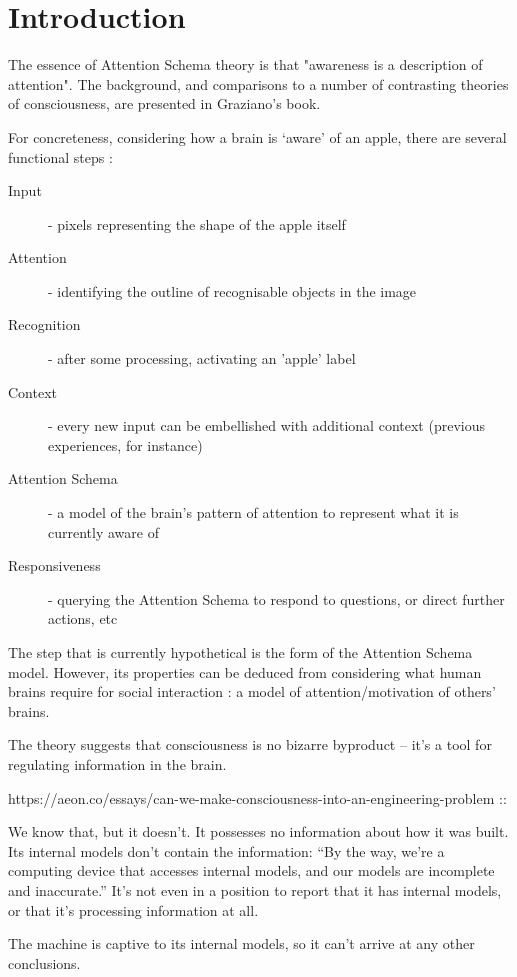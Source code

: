 \documentclass[citeauthoryear]{llncs}
\begin{document}
\section{Introduction}

The essence of Attention Schema theory is that "awareness is a description of attention".
The background, and comparisons to a number of contrasting theories of consciousness,
are presented in Graziano's \cite{graziano2013consciousness} book.  

For concreteness, considering how a brain is `aware' of an apple,
there are several functional steps :

\begin{description}
\item[Input] - pixels representing the shape of the apple itself
\item[Attention] - identifying the outline of recognisable objects in the image 
\item[Recognition] - after some processing, activating an 'apple' label
\item[Context] - every new input can be embellished with additional context (previous experiences, for instance)
\item[Attention Schema] - a model of the brain's pattern of attention to represent what it is currently aware of
\item[Responsiveness] - querying the Attention Schema to respond to questions, or direct further actions, etc
\end{description}

The step that is currently hypothetical is the form of the Attention Schema model.  
However, its properties can be deduced from considering what human brains require
for social interaction : a model of attention/motivation of others' brains.

The theory suggests that consciousness is no bizarre byproduct -- it's a tool for regulating information in the brain.


https://aeon.co/essays/can-we-make-consciousness-into-an-engineering-problem ::

We know that, but it doesn't. It possesses no information about how it was built. 
Its internal models don't contain the information: ``By the way, we're a computing device that 
accesses internal models, and our models are incomplete and inaccurate.''
It's not even in a position to report that it has internal models, or that it's processing information at all.
 
The machine is captive to its internal models, so it can't arrive at any other conclusions.
\end{document}
